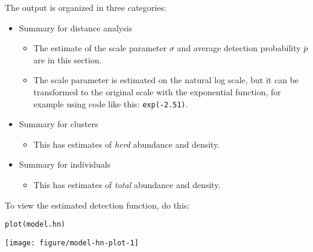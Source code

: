 \documentclass[12pt]{article}\usepackage[]{graphicx}\usepackage[]{color}
\makeatletter
\newcommand{\hlstd}[1]{\textcolor[rgb]{0,0,0}{#1}}%
\newcommand{\hlkwd}[1]{\textcolor[rgb]{0.004,0.004,0.506}{#1}}%
\newenvironment{kframe}{%
 \def\at@end@of@kframe{}%
 \ifinner\ifhmode%
  \def\at@end@of@kframe{\end{minipage}}%
  \begin{minipage}{\columnwidth}%
 \fi\fi%
 \def\FrameCommand##1{\hskip\@totalleftmargin \hskip-\fboxsep
 \colorbox{shadecolor}{##1}\hskip-\fboxsep
     \hskip-\linewidth \hskip-\@totalleftmargin \hskip\columnwidth}%
 \MakeFramed {\advance\hsize-\width
   \@totalleftmargin\z@ \linewidth\hsize
   \@setminipage}}%
 {\par\unskip\endMakeFramed%
 \at@end@of@kframe}
\newenvironment{knitrout}{}{} %
\newcommand{\inr}[1]{\colorbox{inlinecolor}{\texttt{#1}}}
\makeatother
\begin{document}
The output is organized in three categories:
\begin{itemize}
  \item Summary for distance analysis
  \begin{itemize}
    \item The estimate of the scale parameter $\sigma$ and average
      detection probability $\bar{p}$ are in this section.
    \item The scale parameter is estimated on the natural log scale,
      but it can be transformed to the original scale with the
      exponential function, for example using code like this: \inr{exp(-2.51)}.
  \end{itemize}
  \item Summary for clusters
  \begin{itemize}
    \item This has estimates of {\it herd} abundance and density.      
  \end{itemize}
  \item Summary for individuals
  \begin{itemize}
    \item This has estimates of {\it total} abundance and density.      
  \end{itemize}
\end{itemize}


To view the estimated detection function, do this:

\begin{knitrout}
\color{fgcolor}\begin{kframe}
\begin{alltt}
\hlkwd{plot}\hlstd{(model.hn)}
\end{alltt}
\end{kframe}

{\centering \texttt{[image: figure/model-hn-plot-1]} 

}


\end{knitrout}
\end{document}
